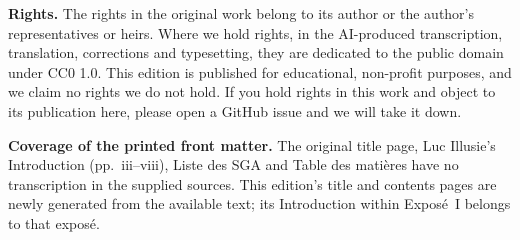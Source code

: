 \noindent\textbf{Rights.} The rights in the original work belong to its author or the author's representatives or heirs. Where we hold rights, in the AI-produced transcription, translation, corrections and typesetting, they are dedicated to the public domain under CC0 1.0. This edition is published for educational, non-profit purposes, and we claim no rights we do not hold. If you hold rights in this work and object to its publication here, please open a GitHub issue and we will take it down.

\noindent\textbf{Coverage of the printed front matter.} The original title page, Luc Illusie's Introduction (pp.~iii--viii), Liste des SGA and Table des mati\`eres have no transcription in the supplied sources. This edition's title and contents pages are newly generated from the available text; its Introduction within Expos\'e~I belongs to that expos\'e.
\endgroup
\clearpage
